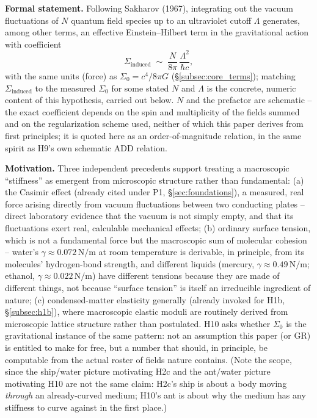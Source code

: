 \documentclass[12pt, a4paper]{article}
\begin{document}
\textbf{Formal statement.} Following Sakharov (1967), integrating out
the vacuum fluctuations of $N$ quantum field species up to an
ultraviolet cutoff $\Lambda$ generates, among other terms, an
effective Einstein--Hilbert term in the gravitational action with
coefficient
\begin{equation}
\Sigma_{\text{induced}} \;\sim\; \frac{N}{8\pi}\,\frac{\Lambda^2}{\hbar c},
\end{equation}
with the same units (force) as $\Sigma_0 = c^4/8\pi G$
(\S\ref{subsec:core_terms}); matching $\Sigma_{\text{induced}}$ to
the measured $\Sigma_0$ for some stated $N$ and $\Lambda$ is the
concrete, numeric content of this hypothesis, carried out below. $N$
and the prefactor are schematic -- the exact coefficient depends on
the spin and multiplicity of the fields summed and on the
regularization scheme used, neither of which this paper derives from
first principles; it is quoted here as an order-of-magnitude
relation, in the same spirit as H9's own schematic ADD relation.

\textbf{Motivation.} Three independent precedents support treating a
macroscopic ``stiffness'' as emergent from microscopic structure
rather than fundamental: (a) the Casimir effect (already cited under
P1, \S\ref{sec:foundations}), a measured, real force arising directly
from vacuum fluctuations between two conducting plates -- direct
laboratory evidence that the vacuum is not simply empty, and that its
fluctuations exert real, calculable mechanical effects; (b) ordinary
surface tension, which is not a fundamental force but the macroscopic
sum of molecular cohesion -- water's $\gamma\approx0.072\,\mathrm{N/m}$
at room temperature is derivable, in principle, from its molecules'
hydrogen-bond strength, and different liquids (mercury,
$\gamma\approx0.49\,\mathrm{N/m}$; ethanol,
$\gamma\approx0.022\,\mathrm{N/m}$) have different tensions because
they are made of different things, not because ``surface tension'' is
itself an irreducible ingredient of nature; (c) condensed-matter
elasticity generally (already invoked for H1b, \S\ref{subsec:h1b}),
where macroscopic elastic moduli are routinely derived from
microscopic lattice structure rather than postulated. H10 asks
whether $\Sigma_0$ is the gravitational instance of the same pattern:
not an assumption this paper (or GR) is entitled to make for free,
but a number that should, in principle, be computable from the actual
roster of fields nature contains. (Note the scope, since the ship/water
picture motivating H2c and the ant/water picture motivating H10 are
not the same claim: H2c's ship is about a body moving \emph{through}
an already-curved medium; H10's ant is about why the medium has any
stiffness to curve against in the first place.)
\end{document}

